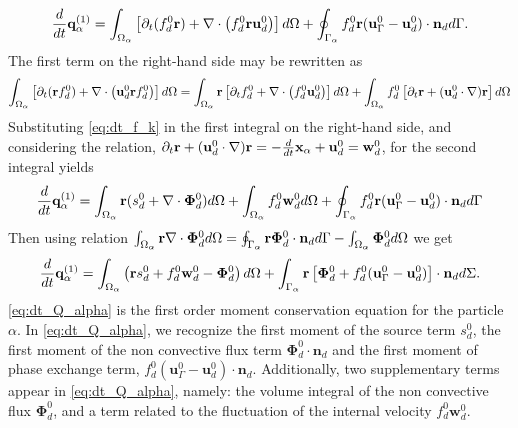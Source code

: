 \begin{equation}
    \frac{d}{dt} \textbf{q}^{(1)}_\alpha
      =  \int_{\Omega_{\alpha}} \left[
        \partial_t(  f_d^0\textbf{r})
        + \mathbf{\nabla}\cdot \left(  f_d^0 \textbf{r}\textbf{u}_d^0\right)
    \right] d\Omega 
    + \oint_{\Gamma_{\alpha}}   f_d^0 \textbf{r}  (\textbf{u}_\Gamma^0-\textbf{u}_d^0)\cdot \textbf{n}_d d\Gamma.
\end{equation}
The first term on the right-hand side may be rewritten as
\begin{equation}
\int_{\Omega_{\alpha}}  \left[
        \partial_t(\textbf{r}  f_d^0)+ \mathbf{\nabla}\cdot \left( \textbf{u}_d^0 \textbf{r} f^0_d\right) 
    \right] d\Omega
    = \int_{\Omega_{\alpha}} \textbf{r}\left[
        \partial_t f_d^0
        + \mathbf{\nabla}\cdot \left(f_d^0 \textbf{u}_d^0\right)
    \right]  d\Omega
    + \int_{\Omega_{\alpha}}  f_d^0 \left[
        \partial_t \textbf{r}
        +(\textbf{u}_d^0 \cdot \mathbf{\nabla}) \textbf{r}
    \right] d\Omega
\end{equation}
Substituting \ref{eq:dt_f_k} in the first integral on the right-hand side, and considering the relation,
$  \partial_t \textbf{r}
+ (\textbf{u}_d^0 \cdot \mathbf{\nabla}) \textbf{r}
= - \frac{d}{dt} \textbf{x}_\alpha  + \textbf{u}_d^0 
= \textbf{w}_d^0$,
for the second integral yields 
\begin{align}
    \frac{d}{dt} \textbf{q}^{(1)}_\alpha = \int_{\Omega_{\alpha}} \textbf{r} (s_d^0 +\mathbf{\nabla}\cdot \bm\Phi_d^0)   d\Omega
    + \int_{\Omega_{\alpha}}  f_d^0\textbf{w}_d^0  d\Omega  + \oint_{\Gamma_{\alpha}}   f_d^0 \textbf{r}  (\textbf{u}_\Gamma^0-\textbf{u}_d^0)\cdot \textbf{n}_d d\Gamma
\end{align}
Then using relation $\int_{\Omega_{\alpha}} \textbf{r}  \mathbf{\nabla}\cdot \bm\Phi_d^0  d\Omega
= \oint_{\Gamma_{\alpha}}  \textbf{r} \bm\Phi_d^0 \cdot \textbf{n}_d  d\Gamma
- \int_{\Omega_{\alpha}}  \bm\Phi_d^0  d\Omega$ we get
\begin{align}
    \frac{d}{dt} \textbf{q}^{(1)}_\alpha
    = \intO{\left( 
        \textbf{r} s_d^0  
        + f_d^0  \textbf{w}_d^0
        - \bm\Phi_d^0
    \right) }
    + \int_{\Gamma_\alpha} \textbf{r} \left[
        \bm\Phi_d^0
        + f_d^0 (\textbf{u}_\Gamma^0-\textbf{u}_d^0)
    \right]\cdot \textbf{n}_d  d\Sigma.
    \label{eq:dt_Q_alpha}
\end{align}
 \ref{eq:dt_Q_alpha} is the first order moment conservation equation for the particle $\alpha$. 
 In \ref{eq:dt_Q_alpha}, we recognize the first moment of the source term $s_d^0$, the first moment of the non convective flux term $\bm\Phi_d^0\cdot\textbf{n}_d$ and the first moment of phase exchange term, $f_d^0 (\textbf{u}_\Gamma^0-\textbf{u}_d^0)\cdot\textbf{n}_d$. 
 Additionally, two supplementary terms appear in \ref{eq:dt_Q_alpha}, namely: the volume integral of the non convective flux $\bm\Phi_d^0$, and a term related to the fluctuation of the internal velocity $f_d^0 \textbf{w}_d^0$.

